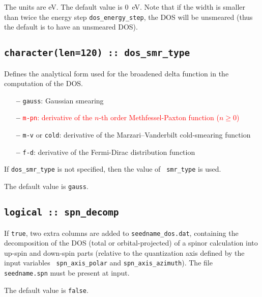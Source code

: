 The units are eV. The default value is 0~eV. Note that if the width is
smaller than twice the energy step {\tt dos\_energy\_step}, the DOS
will be unsmeared (thus the default is to have an unsmeared DOS).


\subsection[dos\_smr\_type]{\tt  character(len=120) :: dos\_smr\_type}

Defines the analytical form used for the broadened delta function in
the computation of the DOS.

\begin{itemize}
  
\item[{\bf --}]
  {\tt gauss}: Gaussian smearing

\item[{\bf --}]
  \textcolor{red}{{\tt m-pn}: derivative of the $n$-th order
    Methfessel-Paxton function ($n\geq 0$)}

\item[{\bf --}]
  {\tt m-v} or {\tt cold}: derivative of the Marzari--Vanderbilt cold-smearing function

\item[{\bf --}]
  {\tt f-d}: derivative of the Fermi-Dirac distribution function

\end{itemize}

If {\tt dos\_smr\_type} is not specified, then the value of {\tt
  smr\_type} is used.  

The default value is {\tt gauss}.

\subsection[spn\_decomp]{\tt logical :: spn\_decomp}
If {\tt true}, two extra columns are added to {\tt seedname\_dos.dat},
containing the decomposition of the DOS (total or orbital-projected)
of a spinor calculation into up-spin and down-spin parts (relative to
the quantization axis defined by the input variables {\tt
  spn\_axis\_polar} and {\tt spn\_axis\_azimuth}). The file {\tt
  seedname.spn} must be present at input.

The default value is \verb#false#.


